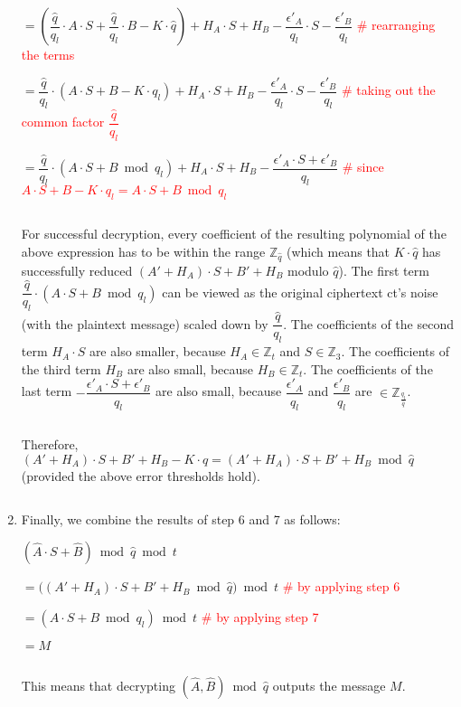 \begin{enumerate}
$ = \left(\dfrac{\hat{q}}{q_{l}}\cdot A\cdot S + \dfrac{\hat{q}}{q_{l}}\cdot B  - K\cdot \hat{q}\right) + H_A\cdot S + H_B - \dfrac{\epsilon'_A}{q_{l}}\cdot S - \dfrac{\epsilon'_B}{q_{l}}$ \textcolor{red}{ \# rearranging the terms}

$ = \dfrac{\hat{q}}{q_{l}}\cdot(A\cdot S + B  - K\cdot q_{l}) + H_A\cdot S + H_B - \dfrac{\epsilon'_A}{q_{l}}\cdot S - \dfrac{\epsilon'_B}{q_{l}}$ \textcolor{red}{ \# taking out the common factor $\dfrac{\hat{q}}{q_{l}}$}

$ = \dfrac{\hat{q}}{q_{l}}\cdot(A\cdot S + B \bmod q_l) + H_A\cdot S + H_B - \dfrac{\epsilon'_A\cdot S + \epsilon'_B}{q_{l}}$ \textcolor{red}{ \# since $A\cdot S + B - K\cdot q_{l} = A\cdot S + B \bmod q_l$}

$ $

For successful decryption, every coefficient of the resulting polynomial of the above expression has to be within the range $\mathbb{Z}_{\hat{q}}$ (which means that $K\cdot\hat{q}$ has successfully reduced $(A' + H_A)\cdot S + B' + H_B$ modulo $\hat{q}$). The first term $\dfrac{\hat{q}}{q_{l}}\cdot(A\cdot S + B \bmod q_l)$ can be viewed as the original ciphertext \textsf{ct}'s noise (with the plaintext message) scaled down by $\dfrac{\hat{q}}{q_l}$. The coefficients of the second term $H_A \cdot S$ are also smaller, because $H_A \in \mathbb{Z}_t$ and $S \in \mathbb{Z}_3$. The coefficients of the third term $H_B$ are also small, because $H_B \in \mathbb{Z}_t$. The coefficients of the last term $- \dfrac{\epsilon'_A\cdot S + \epsilon'_B}{q_{l}}$ are also small, because $\dfrac{\epsilon'_A}{q_l}$ and $\dfrac{\epsilon'_B}{q_l}$ are $\in \mathbb{Z}_{\frac{q_l}{\hat{q}}}$. 

$ $

Therefore, $(A' + H_A)\cdot S + B' + H_B - K\cdot \hat{q} = (A' + H_A)\cdot S + B' + H_B \bmod \hat{q}$ (provided the above error thresholds hold). 

$ $

\item Finally, we combine the results of step 6 and 7 as follows: 

$(\hat{A}\cdot S + \hat{B}) \bmod \hat{q} \bmod t$

$= \bm((A' + H_A)\cdot S + B' + H_B \bmod \hat{q}\bm) \bmod t$ \textcolor{red}{ \# by applying step 6}

$ = (A\cdot S + B \bmod q_l) \bmod t$ \textcolor{red}{ \# by applying step 7}

$ = M$

$ $

This means that decrypting $(\hat{A}, \hat{B}) \bmod \hat{q}$ outputs the message $M$.

\end{enumerate}

